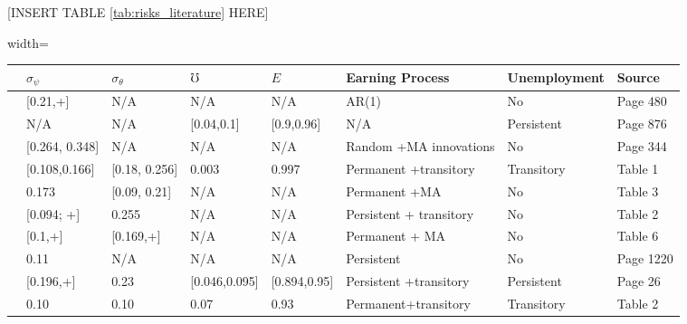 \begin{center}
[INSERT TABLE \ref{tab:risks_literature} HERE]  
\end{center}

	\begin{sidewaystable}[p]
\centering
\begin{adjustbox}{width={\textwidth}}
\begin{threeparttable}
\caption{The size and nature of idiosyncratic income risks in the literature}
\label{tab:risks_literature}

\begin{tabular}{llllllll}
\hline 
                                 & $\sigma_\psi$  & $\sigma_\theta$ & $\mho$        & $E$          & Earning Process         & Unemployment & Source    \\
 \hline 
\cite{huggett1996wealth}         & [0.21,+]       & N/A             & N/A           & N/A          & AR(1)                   & No           & Page 480  \\
\cite{krusell1998income}         & N/A            & N/A             & [0.04,0.1]    & [0.9,0.96]   & N/A                     & Persistent   & Page 876  \\
\cite{cagetti2003wealth}         & [0.264, 0.348] & N/A             & N/A           & N/A          & Random +MA innovations  & No           & Page 344  \\
\cite{gourinchas2002consumption} & [0.108,0.166]  & [0.18, 0.256]   & 0.003         & 0.997        & Permanent +transitory   & Transitory   & Table 1   \\
\cite{meghir2004income}          & 0.173          & [0.09, 0.21]    & N/A           & N/A          & Permanent +MA           & No           & Table 3   \\
\cite{storesletten2004cyclical}  & [0.094; +]     & 0.255           & N/A           & N/A          & Persistent + transitory & No           & Table 2   \\
\cite{blundell_consumption_2008} & [0.1,+]        & [0.169,+]       & N/A           & N/A          & Permanent + MA          & No           & Table 6   \\
\cite{kaplan2014model}           & 0.11           & N/A             & N/A           & N/A          & Persistent              & No           & Page 1220 \\
\cite{krueger2016macroeconomics} & [0.196,+]      & 0.23            & [0.046,0.095] & [0.894,0.95] & Persistent +transitory  & Persistent   & Page 26   \\
\cite{carroll2017distribution}   & 0.10           & 0.10            & 0.07          & 0.93         & Permanent+transitory    & Transitory   & Table 2   \\

\end{tabular}
\end{threeparttable}
\end{adjustbox}
\end{sidewaystable}

